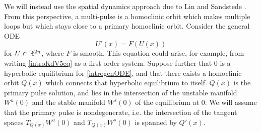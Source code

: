 \documentclass[thesis2.tex]{subfiles}
\begin{document}
We will instead use the spatial dynamics approach due to Lin \cite{Lin1990} and Sandstede \cite{Sandstede1993,SandstedeStrut}. From this perspective, a multi-pulse is a homoclinic orbit which makes multiple loops but which stays close to a primary homoclinic orbit. Consider the general ODE
\begin{equation}\label{introgenODE}
U'(x) = F(U(x))
\end{equation}
for $U \in \mathbb{R}^{2n}$, where $F$ is smooth. This equation could arise, for example, from writing 
\cref{introKdV5eq} as a first-order system. Suppose further that 0 is a hyperbolic equilibrium for \cref{introgenODE}, and that there exists a homoclinic orbit $Q(x)$ which connects that hyperbolic equilibrium to itself. $Q(x)$ is the primary pulse solution, and lies in the intersection of the unstable manifold $W^u(0)$ and the stable manifold $W^s(0)$ of the equilibrium at 0. We will assume that the primary pulse is nondegenerate, i.e. the intersection of the tangent spaces $T_{Q(x)}W^u(0)$ and $T_{Q(x)}W^s(0)$ is spanned by $Q'(x)$.
\end{document}
